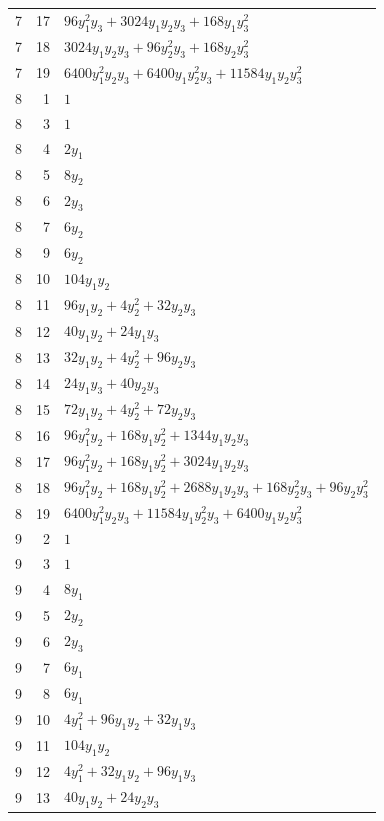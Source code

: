 \documentclass[10pt,a4paper]{article}
\begin{document}
{\begin{longtable}{rrp{125mm}}
7 & 17 & $96 y_{1}^{2} y_{3} + 3024 y_{1} y_{2} y_{3} + 168 y_{1} y_{3}^{2}$\\
7 & 18 & $3024 y_{1} y_{2} y_{3} + 96 y_{2}^{2} y_{3} + 168 y_{2} y_{3}^{2}$\\
7 & 19 & $6400 y_{1}^{2} y_{2} y_{3} + 6400 y_{1} y_{2}^{2} y_{3} + 11584 y_{1} y_{2} y_{3}^{2}$\\
8 & 1 & $1$\\
8 & 3 & $1$\\
8 & 4 & $2 y_{1}$\\
8 & 5 & $8 y_{2}$\\
8 & 6 & $2 y_{3}$\\
8 & 7 & $6 y_{2}$\\
8 & 9 & $6 y_{2}$\\
8 & 10 & $104 y_{1} y_{2}$\\
8 & 11 & $96 y_{1} y_{2} + 4 y_{2}^{2} + 32 y_{2} y_{3}$\\
8 & 12 & $40 y_{1} y_{2} + 24 y_{1} y_{3}$\\
8 & 13 & $32 y_{1} y_{2} + 4 y_{2}^{2} + 96 y_{2} y_{3}$\\
8 & 14 & $24 y_{1} y_{3} + 40 y_{2} y_{3}$\\
8 & 15 & $72 y_{1} y_{2} + 4 y_{2}^{2} + 72 y_{2} y_{3}$\\
8 & 16 & $96 y_{1}^{2} y_{2} + 168 y_{1} y_{2}^{2} + 1344 y_{1} y_{2} y_{3}$\\
8 & 17 & $96 y_{1}^{2} y_{2} + 168 y_{1} y_{2}^{2} + 3024 y_{1} y_{2} y_{3}$\\
8 & 18 & $96 y_{1}^{2} y_{2} + 168 y_{1} y_{2}^{2} + 2688 y_{1} y_{2} y_{3} + 168 y_{2}^{2} y_{3} + 96 y_{2} y_{3}^{2}$\\
8 & 19 & $6400 y_{1}^{2} y_{2} y_{3} + 11584 y_{1} y_{2}^{2} y_{3} + 6400 y_{1} y_{2} y_{3}^{2}$\\
9 & 2 & $1$\\
9 & 3 & $1$\\
9 & 4 & $8 y_{1}$\\
9 & 5 & $2 y_{2}$\\
9 & 6 & $2 y_{3}$\\
9 & 7 & $6 y_{1}$\\
9 & 8 & $6 y_{1}$\\
9 & 10 & $4 y_{1}^{2} + 96 y_{1} y_{2} + 32 y_{1} y_{3}$\\
9 & 11 & $104 y_{1} y_{2}$\\
9 & 12 & $4 y_{1}^{2} + 32 y_{1} y_{2} + 96 y_{1} y_{3}$\\
9 & 13 & $40 y_{1} y_{2} + 24 y_{2} y_{3}$\\

\end{longtable}}
\end{document}
